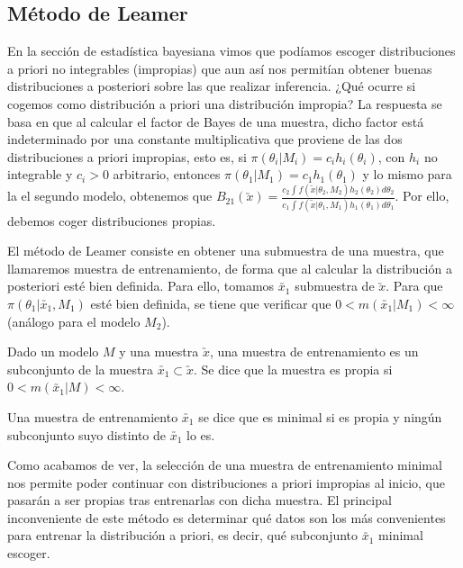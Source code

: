 \subsection{Método de Leamer}



	En la sección de estadística bayesiana vimos que podíamos escoger distribuciones a priori no integrables (impropias) que aun así nos permitían obtener buenas distribuciones a posteriori sobre las que realizar inferencia. ¿Qué ocurre si cogemos como distribución a priori una distribución impropia? La respuesta se basa en que al calcular el factor de Bayes de una muestra, dicho factor está indeterminado por una constante multiplicativa que proviene de las dos distribuciones a priori impropias, esto es, si $\pi(\theta_i|M_i) = c_ih_i(\theta_i)$, con $h_i$ no integrable y $c_i > 0$ arbitrario, entonces $\pi(\theta_1 | M_1) = c_1 h_1(\theta_1) $ y lo mismo para la el segundo modelo, obtenemos que  $B_{21}(\utilde{x}) = \frac{c_2 \int{f(\utilde{x} | \theta_2 , M_2)h_2(\theta_2) d\theta_2}}{c_1 \int{f(\utilde{x} | \theta_1 , M_1) h_1(\theta_1) d\theta_1}}$. Por ello, debemos coger distribuciones propias.

	El método de Leamer consiste en obtener una submuestra de una muestra, que llamaremos muestra de entrenamiento, de forma que al calcular la distribución a posteriori esté bien definida. Para ello, tomamos $\utilde{x_1}$ submuestra de $\utilde{x}$. Para que $\pi(\theta_1 | \utilde{x_1}, M_1)$ esté bien definida, se tiene que verificar que $ 0 < m(\utilde{x_1} | M_1) < \infty$ (análogo para el modelo $M_2$).

	\begin{definition}
		Dado un modelo $M$ y una muestra $\utilde{x}$, una muestra de entrenamiento es un subconjunto de la muestra $\utilde{x_1} \subset \utilde{x}$. Se dice que la muestra es propia si $0 < m(\utilde{x_1}|M) < \infty$.

		Una muestra de entrenamiento $\utilde{x_1}$ se dice que es minimal si es propia y ningún subconjunto suyo distinto de $\utilde{x_1}$ lo es.
	\end{definition}

	Como acabamos de ver, la selección de una muestra de entrenamiento minimal nos permite poder continuar con distribuciones a priori impropias al inicio, que pasarán a ser propias tras entrenarlas con dicha muestra. El principal inconveniente de este método es determinar qué datos son los más convenientes para entrenar la distribución a priori, es decir, qué subconjunto $\utilde{x_1}$ minimal escoger.

